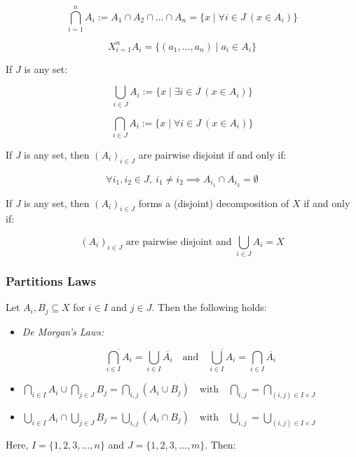 \[
	\bigcap_{i=1}^{n} A_i := A_1 \cap A_2 \cap \dots \cap A_n = \{ x \mid \forall i \in J \ (x \in A_i) \}
\]

\[
	X_{i=1}^{n} A_i = \{(a_1, \dots, a_n) \mid a_i \in A_i \}
\]

If \( J \) is any set:

\[
	\bigcup_{i \in J} A_i := \{ x \mid \exists i \in J \ (x \in A_i) \}
\]

\[
	\bigcap_{i \in J} A_i := \{ x \mid \forall i \in J \ (x \in A_i) \}
\]

If \emph{J} is any set, then \( {(A_i)}_{i \in J} \) are pairwise disjoint if and only if:

\[
	\forall i_1, i_2 \in J, \ i_1 \neq i_2 \implies A_{i_1} \cap A_{i_2} = \emptyset
\]

If \emph{J} is any set, then \( {(A_i)}_{i \in J} \) forms a (disjoint) decomposition of \(X\) if 
and only if:

\[
	{(A_i)}_{i \in J} \text{ are pairwise disjoint and } \bigcup_{i \in J} A_i = X
\]

\subsubsection{Partitions Laws}

Let \( A_i, B_j \subseteq X \) for \( i \in I \) and \( j \in J \). Then the following holds:

\begin{itemize}

	\item\emph{De Morgan's Laws:}

	\[
		\overline{\bigcap_{i \in I} A_i}= \bigcup_{i \in I} \overline{A_i} \quad \text{and} \quad 
		\overline{\bigcup_{i \in I} A_i} = \bigcap_{i \in I} \overline{A_i}
	\]

	\item\(
		\bigcap_{i \in I} A_i \cup \bigcap_{j \in J} B_j = \bigcap_{i,j} (A_i \cup B_j) \quad \text{with} 
		\quad \bigcap_{i,j} = \bigcap_{(i,j) \in I \times J}
	\)

	\item\(
		\bigcup_{i \in I} A_i \cap \bigcup_{j \in J} B_j = \bigcup_{i,j} (A_i \cap B_j) \quad \text{with} 
		\quad \bigcup_{i,j} = \bigcup_{(i,j) \in I \times J}
	\)

\end{itemize}

Here, \( I = \{ 1, 2, 3, \dots, n \} \) and \( J = \{ 1, 2, 3, \dots, m \} \). Then:

